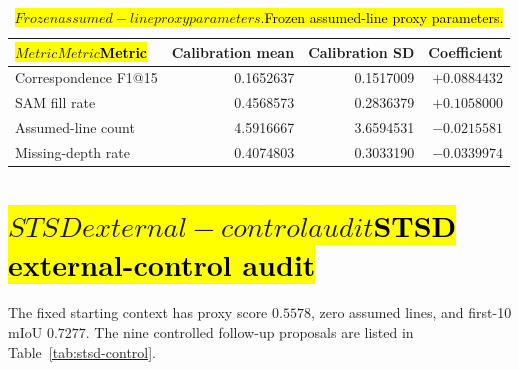 \documentclass[a4paper,fleqn]{cas-dc}
\let\texthl\hl
\renewcommand{\hl}[1]{\ifmmode\colorbox{yellow}{\ensuremath{#1}}\else\texthl{#1}\fi}
\begin{document}
\begin{table}[t]
\caption{\hl{Frozen assumed-line proxy parameters.}}\label{tab:assume-proxy-parameters}
\centering
\begin{tabular}{lrrr}
\toprule
\hl{Metric} & Calibration mean & Calibration SD & Coefficient \\
\midrule
\rowcolor{yellow!25}Correspondence F1@15 & 0.1652637 & 0.1517009 & $+0.0884432$ \\
\rowcolor{yellow!25}SAM fill rate & 0.4568573 & 0.2836379 & $+0.1058000$ \\
\rowcolor{yellow!25}Assumed-line count & 4.5916667 & 3.6594531 & $-0.0215581$ \\
\rowcolor{yellow!25}Missing-depth rate & 0.4074803 & 0.3033190 & $-0.0339974$ \\
\bottomrule
\end{tabular}
\end{table}

\section{\hl{STSD external-control audit}}\label{app:stsd-control}

\begin{hlbox}
The fixed starting context has proxy score $0.5578$, zero assumed lines, and first-10 mIoU $0.7277$. The nine controlled follow-up proposals are listed in Table~\ref{tab:stsd-control}.
\end{hlbox}
\end{document}

